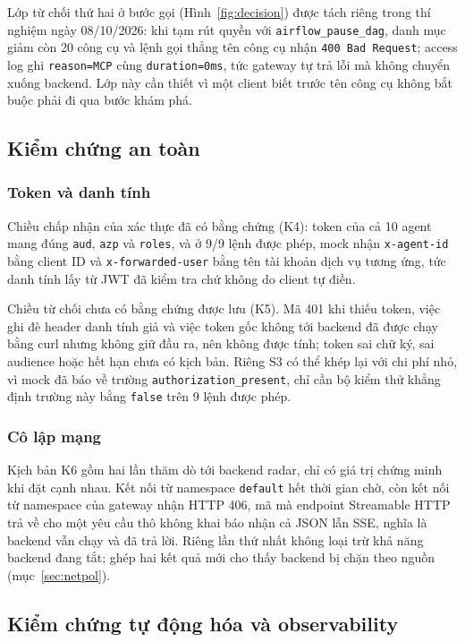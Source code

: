 Lớp từ chối thứ hai ở bước gọi (Hình~\ref{fig:decision}) được tách riêng trong thí nghiệm ngày 08/10/2026: khi tạm rút quyền với \texttt{airflow\_pause\_dag}, danh mục giảm còn 20 công cụ và lệnh gọi thẳng tên công cụ nhận \texttt{400 Bad Request}; access log ghi \texttt{reason=MCP} cùng \texttt{duration=0ms}, tức gateway tự trả lỗi mà không chuyển xuống backend. Lớp này cần thiết vì một client biết trước tên công cụ không bắt buộc phải đi qua bước khám phá.

\subsection{Kiểm chứng an toàn}

\subsubsection{Token và danh tính}

Chiều chấp nhận của xác thực đã có bằng chứng (K4): token của cả 10 agent mang đúng \texttt{aud}, \texttt{azp} và \texttt{roles}, và ở 9/9 lệnh được phép, mock nhận \texttt{x-agent-id} bằng client ID và \texttt{x-forwarded-user} bằng tên tài khoản dịch vụ tương ứng, tức danh tính lấy từ JWT đã kiểm tra chứ không do client tự điền.

Chiều từ chối chưa có bằng chứng được lưu (K5). Mã 401 khi thiếu token, việc ghi đè header danh tính giả và việc token gốc không tới backend đã được chạy bằng curl nhưng không giữ đầu ra, nên không được tính; token sai chữ ký, sai audience hoặc hết hạn chưa có kịch bản. Riêng S3 có thể khép lại với chi phí nhỏ, vì mock đã báo về trường \texttt{authorization\_present}, chỉ cần bộ kiểm thử khẳng định trường này bằng \texttt{false} trên 9 lệnh được phép.

\subsubsection{Cô lập mạng}

Kịch bản K6 gồm hai lần thăm dò tới backend radar, chỉ có giá trị chứng minh khi đặt cạnh nhau. Kết nối từ namespace \texttt{default} hết thời gian chờ, còn kết nối từ namespace của gateway nhận HTTP 406, mã mà endpoint Streamable HTTP trả về cho một yêu cầu thô không khai báo nhận cả JSON lẫn SSE, nghĩa là backend vẫn chạy và đã trả lời. Riêng lần thứ nhất không loại trừ khả năng backend đang tắt; ghép hai kết quả mới cho thấy backend bị chặn theo nguồn (mục~\ref{sec:netpol}).
\endgroup
\subsection{Kiểm chứng tự động hóa và observability}

